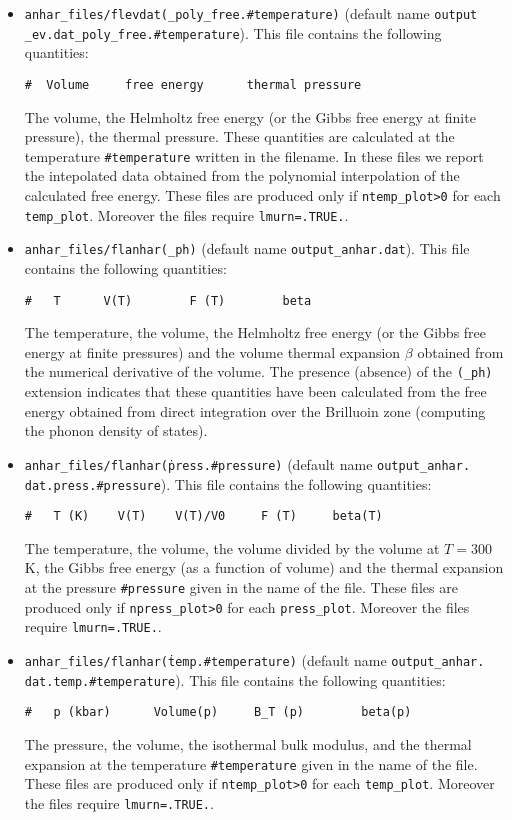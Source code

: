 \documentclass[12pt,a4paper,twoside]{report}
\begin{document}
\begin{itemize}
\item
\texttt{anhar\_files/flevdat(\_poly\_free.\#temperature)} (default name \texttt{output} \texttt{\_ev.dat\_poly\_free.\#temperature}).
This file contains the following quantities:
\begin{verbatim}
#  Volume     free energy      thermal pressure 
\end{verbatim}
The volume, the Helmholtz free energy (or the Gibbs free
energy at finite pressure), the thermal pressure.
These quantities are calculated at the temperature \texttt{\#temperature} 
written in the filename.
In these files we report the intepolated data obtained from the
polynomial interpolation of the calculated free energy.
These files are produced only if \texttt{ntemp\_plot>0} for each
\texttt{temp\_plot}. Moreover the files require \texttt{lmurn=.TRUE.}.

\item 
\texttt{anhar\_files/flanhar(\_ph)} (default name \texttt{output\_anhar.dat}).
This file contains the following quantities:
\begin{verbatim}
#   T      V(T)        F (T)        beta 
\end{verbatim}
The temperature, the volume, the Helmholtz free energy (or the Gibbs free
energy at finite pressures) and the volume
thermal expansion $\beta$ obtained from the numerical derivative of the
volume. 
The presence (absence) of the \texttt{(\_ph)} extension indicates that
these quantities have been calculated from the free energy obtained from 
direct integration over the Brilluoin zone (computing the phonon density
of states). 

\item
\texttt{anhar\_files/flanhar(\.press.\#pressure)} (default name \texttt{output\_anhar.} \texttt{dat.press.\#pressure}).
This file contains the following quantities:
\begin{verbatim}
#   T (K)    V(T)    V(T)/V0     F (T)     beta(T) 
\end{verbatim}
The temperature, the volume, the volume divided by the volume at $T=300$ K,
the Gibbs free energy (as a function of volume) and the thermal expansion
at the pressure \texttt{\#pressure} given in the name of the file.
These files are produced only if \texttt{npress\_plot>0} for each
\texttt{press\_plot}. Moreover the files require \texttt{lmurn=.TRUE.}.

\item
\texttt{anhar\_files/flanhar(\.temp.\#temperature)} (default name \texttt{output\_anhar.} \texttt{dat.temp.\#temperature}).
This file contains the following quantities:
\begin{verbatim}
#   p (kbar)      Volume(p)     B_T (p)        beta(p)
\end{verbatim}
The pressure, the volume, the isothermal bulk modulus, and the thermal 
expansion at the temperature \texttt{\#temperature} given in the name 
of the file.
These files are produced only if \texttt{ntemp\_plot>0} for each
\texttt{temp\_plot}. Moreover the files require \texttt{lmurn=.TRUE.}.


\end{itemize}
\end{document}
